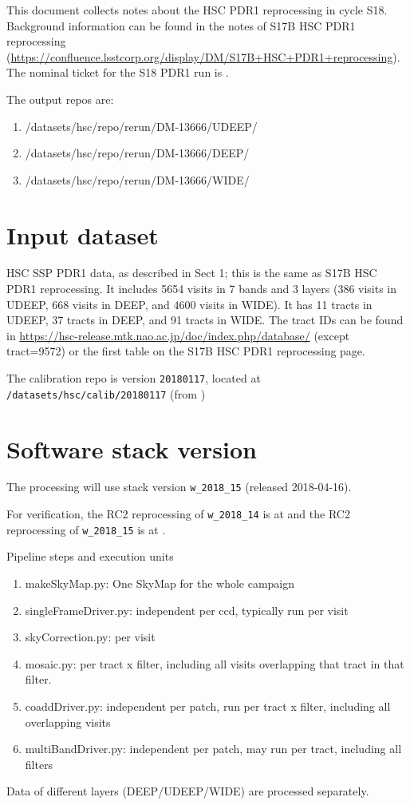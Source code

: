 This document collects notes about the HSC PDR1 reprocessing in cycle S18.
Background information can be found in the notes of S17B HSC PDR1 reprocessing (\url{https://confluence.lsstcorp.org/display/DM/S17B+HSC+PDR1+reprocessing}).
The nominal ticket for the S18 PDR1 run is .

The output repos are:

\begin{enumerate}
\item
/datasets/hsc/repo/rerun/DM-13666/UDEEP/
\item
/datasets/hsc/repo/rerun/DM-13666/DEEP/
\item
/datasets/hsc/repo/rerun/DM-13666/WIDE/
\end{enumerate}

\section{Input dataset}

HSC SSP PDR1 data, as described in  Sect 1; this is the same as S17B HSC PDR1 reprocessing. It includes 5654 visits in 7 bands and 3 layers (386 visits in UDEEP, 668 visits in DEEP, and 4600 visits in WIDE). It has 11 tracts in UDEEP, 37 tracts in DEEP, and 91 tracts in WIDE.
The tract IDs can be found in \url{https://hsc-release.mtk.nao.ac.jp/doc/index.php/database/} (except tract=9572) or the first table on the S17B HSC PDR1 reprocessing page.

The calibration repo is version \texttt{20180117}, located at \texttt{/datasets/hsc/calib/20180117}  (from )


\section{Software stack version}
The processing will use stack version \texttt{w\_2018\_15} (released 2018-04-16).

For verification, the RC2 reprocessing of \texttt{w\_2018\_14} is at  and the RC2 reprocessing of \texttt{w\_2018\_15} is at .

Pipeline steps and execution units
\begin{enumerate}
\item
makeSkyMap.py:   One SkyMap for the whole campaign
\item
singleFrameDriver.py:   independent per ccd, typically run per visit
\item
skyCorrection.py:   per visit
\item
mosaic.py:   per tract x filter, including all visits overlapping that tract in that filter.
\item
coaddDriver.py: independent per patch, run per tract x filter, including all overlapping visits
\item
multiBandDriver.py:   independent per patch, may run per tract, including all filters
\end{enumerate}
Data of different layers (DEEP/UDEEP/WIDE) are processed separately.


